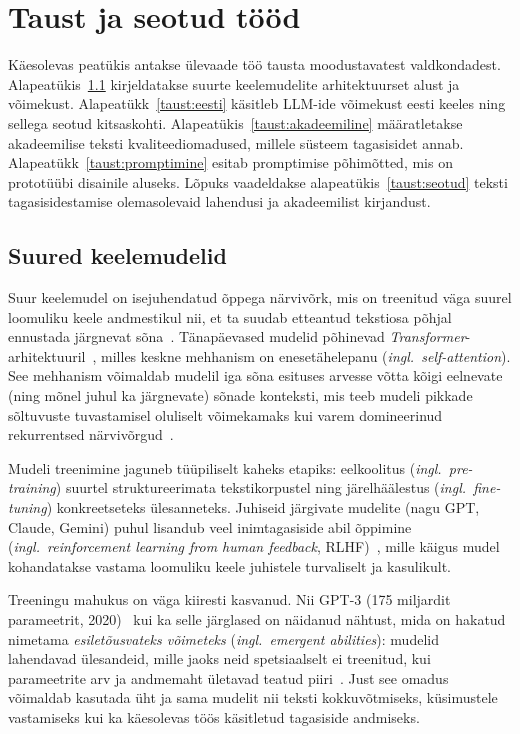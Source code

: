 \section{Taust ja seotud tööd} \label{taust}

Käesolevas peatükis antakse ülevaade töö tausta moodustavatest valdkondadest. Alapeatükis~\ref{taust:llm} kirjeldatakse suurte keelemudelite arhitektuurset alust ja võimekust. Alapeatükk~\ref{taust:eesti} käsitleb LLM-ide võimekust eesti keeles ning sellega seotud kitsaskohti. Alapeatükis~\ref{taust:akadeemiline} määratletakse akadeemilise teksti kvaliteediomadused, millele süsteem tagasisidet annab. Alapeatükk~\ref{taust:promptimine} esitab promptimise põhimõtted, mis on prototüübi disainile aluseks. Lõpuks vaadeldakse alapeatükis~\ref{taust:seotud} teksti tagasisidestamise olemasolevaid lahendusi ja akadeemilist kirjandust.

\subsection{Suured keelemudelid} \label{taust:llm}

Suur keelemudel on isejuhendatud õppega närvivõrk, mis on treenitud väga suurel loomuliku keele andmestikul nii, et ta suudab etteantud tekstiosa põhjal ennustada järgnevat sõna~\cite{vaswani_attention_2017, brown_language_2020}. Tänapäevased mudelid põhinevad \emph{Transformer}-arhitektuuril~\cite{vaswani_attention_2017}, milles keskne mehhanism on enesetähelepanu (\emph{ingl.\ self-attention}). See mehhanism võimaldab mudelil iga sõna esituses arvesse võtta kõigi eelnevate (ning mõnel juhul ka järgnevate) sõnade konteksti, mis teeb mudeli pikkade sõltuvuste tuvastamisel oluliselt võimekamaks kui varem domineerinud rekurrentsed närvivõrgud~\cite{hochreiter_lstm_1997}.

Mudeli treenimine jaguneb tüüpiliselt kaheks etapiks: eelkoolitus (\emph{ingl.\ pre-training}) suurtel struktureerimata tekstikorpustel ning järelhäälestus (\emph{ingl.\ fine-tuning}) konkreetseteks ülesanneteks. Juhiseid järgivate mudelite (nagu GPT, Claude, Gemini) puhul lisandub veel inimtagasiside abil õppimine (\emph{ingl.\ reinforcement learning from human feedback}, RLHF)~\cite{ouyang_instructgpt_2022}, mille käigus mudel kohandatakse vastama loomuliku keele juhistele turvaliselt ja kasulikult.

Treeningu mahukus on väga kiiresti kasvanud. Nii GPT-3 (175 miljardit parameetrit, 2020)~\cite{brown_language_2020} kui ka selle järglased on näidanud nähtust, mida on hakatud nimetama \emph{esiletõusvateks võimeteks} (\emph{ingl.\ emergent abilities}): mudelid lahendavad ülesandeid, mille jaoks neid spetsiaalselt ei treenitud, kui parameetrite arv ja andmemaht ületavad teatud piiri~\cite{wei_emergent_2022}. Just see omadus võimaldab kasutada üht ja sama mudelit nii teksti kokkuvõtmiseks, küsimustele vastamiseks kui ka käesolevas töös käsitletud tagasiside andmiseks.

